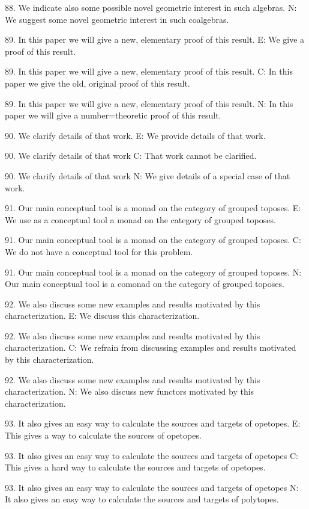 88. We indicate also some possible novel geometric interest in such algebras.
N: We suggest some novel geometric interest in such coalgebras.

89. In this paper we will give a new, elementary proof of this result.
E: We give a proof of this result.

89. In this paper we will give a new, elementary proof of this result.
C: In this paper we give the old, original proof of this result.

89. In this paper we will give a new, elementary proof of this result.
N: In this paper we will give a number=theoretic proof of this result.

90. We clarify details of that work.
E: We provide details of that work.

90. We clarify details of that work
C: That work cannot be clarified.

90. We clarify details of that work
N: We give details of a special case of that work.

91. Our main conceptual tool is a monad on the category of grouped toposes.
E: We use as a conceptual tool a monad on the category of grouped toposes.

91. Our main conceptual tool is a monad on the category of grouped toposes.
C: We do not have a conceptual tool for this problem.

91. Our main conceptual tool is a monad on the category of grouped toposes.
N: Our main conceptual tool is a comonad on the category of grouped toposes.

92. We also discuss some new examples and results motivated by this characterization.
E: We discuss this characterization.

92. We also discuss some new examples and results motivated by this characterization.
C: We refrain from discussing examples and results motivated by this characterization.

92. We also discuss some new examples and results motivated by this characterization.
N: We also discuss new functors motivated by this characterization.

93. It also gives an easy way to calculate the sources and targets of opetopes.
E: This gives a way to calculate the sources of opetopes.

93. It also gives an easy way to calculate the sources and targets of opetopes
C: This gives a hard way to calculate the sources and targets of opetopes.

93. It also gives an easy way to calculate the sources and targets of opetopes
N: It also gives an easy way to calculate the sources and targets of polytopes.
 